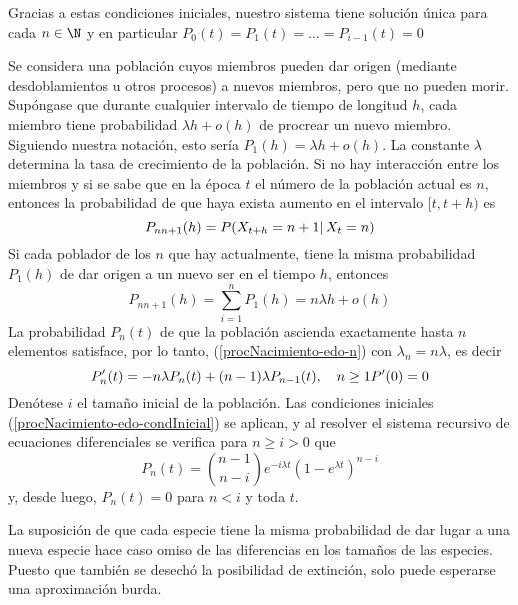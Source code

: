 Gracias a estas condiciones iniciales, nuestro sistema tiene solución única para cada $n\in\N$ y en particular $P_0(t)=P_1(t)=\ldots=P_{i-1}(t)=0$
\begin{Ejm}
    Se considera una población cuyos miembros pueden dar origen (mediante desdoblamientos u otros procesos) a nuevos miembros, pero que no pueden morir. Supóngase que durante cualquier intervalo de tiempo de longitud $h$, cada miembro tiene probabilidad $\lambda h + o(h)$ de procrear un nuevo miembro. Siguiendo nuestra notación, esto sería $P_1(h)=\lambda h + o(h)$. La constante $\lambda$ determina la tasa de crecimiento de la población. Si no hay interacción entre los miembros y si se sabe que en la época $t$ el número de la población actual es $n$, entonces la probabilidad de que haya exista aumento en el intervalo $[t,t+h)$  es $$P_{n n+1}(h)=P(X_{t+h}=n+1|\thinspace X_t=n)$$
    Si cada poblador de los $n$ que hay actualmente, tiene la misma probabilidad $P_1(h)$ de dar origen a un nuevo ser en el tiempo $h$, entonces
    $$P_{n n+1}(h)=\sum_{i=1}^n P_1(h)= n\lambda h + o(h)$$
    La probabilidad $P_n(t)$ de que la población ascienda exactamente hasta $n$ elementos satisface, por lo tanto, (\ref{procNacimiento-edo-n}) con $\lambda_n= n\lambda$, es decir $$ P'_n(t)=-n\lambda P_n(t)+(n-1)\lambda P_{n-1}(t),\quad n\geq 1\\P'(0)=0$$
    Denótese $i$ el tamaño inicial de la población.
    Las condiciones iniciales (\ref{procNacimiento-edo-condInicial}) se aplican, y al resolver el sistema recursivo de ecuaciones diferenciales se verifica para $n\geq i>0$ que 
    $$P_n(t)={ n-1 \choose n-i}e^{-i\lambda t}(1-e^{\lambda t})^{n-i}$$
    y, desde luego, $P_n(t)=0$ para $n<i$ y toda $t$.
\end{Ejm}
La suposición de que cada especie tiene la misma probabilidad de dar lugar a una nueva especie hace caso omiso de las diferencias en los tamaños de las especies. Puesto que también se desechó la posibilidad de extinción, solo puede esperarse una aproximación burda.